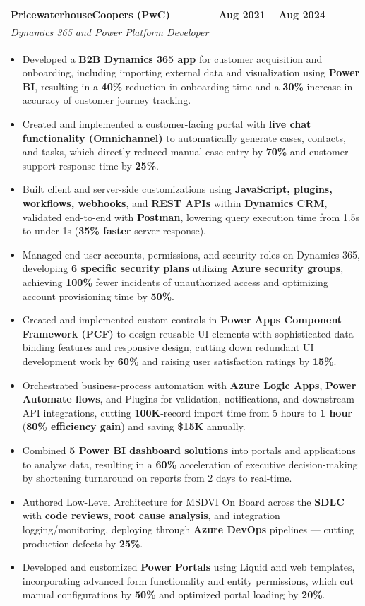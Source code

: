 \documentclass[letterpaper,10pt]{article}
\makeatletter
\newcommand{\resumeItem}[1]{
\item\small{{#1}\vspace{-3.5pt}}
}
\newcommand{\resumeSubheading}[4]{
\vspace{6pt}
\item
\begin{tabular*}{1.0\textwidth}[t]{l@{\extracolsep{\fill}}r}
\textbf{#1} & \textbf{\small #2} \\
\textit{\small#3} & \textit{\small #4} \\
\end{tabular*}\vspace{-5.5pt}
}
\newcommand{\resumeItemListStart}{\begin{itemize}[leftmargin=*, itemsep=0pt, topsep=0pt]}
\newcommand{\resumeItemListEnd}{\end{itemize}\vspace{-3pt}}
\makeatother
\begin{document}
\resumeSubheading
  {PricewaterhouseCoopers (PwC)}{Aug 2021 -- Aug 2024}
  {Dynamics 365 and Power Platform Developer}{}
\resumeItemListStart
  \resumeItem{Developed a \textbf{B2B Dynamics 365 app} for customer acquisition and onboarding, including importing external data and visualization using \textbf{Power BI}, resulting in a \textbf{40\%} reduction in onboarding time and a \textbf{30\%} increase in accuracy of customer journey tracking.}
  \resumeItem{Created and implemented a customer-facing portal with \textbf{live chat functionality (Omnichannel)} to automatically generate cases, contacts, and tasks, which directly reduced manual case entry by \textbf{70\%} and customer support response time by \textbf{25\%}.}
  \resumeItem{Built client and server-side customizations using \textbf{JavaScript, plugins, workflows, webhooks}, and \textbf{REST APIs} within \textbf{Dynamics CRM}, validated end-to-end with \textbf{Postman}, lowering query execution time from 1.5s to under 1s (\textbf{35\% faster} server response).}
  \resumeItem{Managed end-user accounts, permissions, and security roles on Dynamics 365, developing \textbf{6 specific security plans} utilizing \textbf{Azure security groups}, achieving \textbf{100\%} fewer incidents of unauthorized access and optimizing account provisioning time by \textbf{50\%}.}
  \resumeItem{Created and implemented custom controls in \textbf{Power Apps Component Framework (PCF)} to design reusable UI elements with sophisticated data binding features and responsive design, cutting down redundant UI development work by \textbf{60\%} and raising user satisfaction ratings by \textbf{15\%}.}
  \resumeItem{Orchestrated business-process automation with \textbf{Azure Logic Apps}, \textbf{Power Automate flows}, and Plugins for validation, notifications, and downstream API integrations, cutting \textbf{100K}-record import time from 5 hours to \textbf{1 hour} (\textbf{80\% efficiency gain}) and saving \textbf{\$15K} annually.}
  \resumeItem{Combined \textbf{5 Power BI dashboard solutions} into portals and applications to analyze data, resulting in a \textbf{60\%} acceleration of executive decision-making by shortening turnaround on reports from 2 days to real-time.}
  \resumeItem{Authored Low-Level Architecture for MSDVI On Board across the \textbf{SDLC} with \textbf{code reviews}, \textbf{root cause analysis}, and integration logging/monitoring, deploying through \textbf{Azure DevOps} pipelines — cutting production defects by \textbf{25\%}.}
  \resumeItem{Developed and customized \textbf{Power Portals} using Liquid and web templates, incorporating advanced form functionality and entity permissions, which cut manual configurations by \textbf{50\%} and optimized portal loading by \textbf{20\%}.}
\resumeItemListEnd
\end{document}
